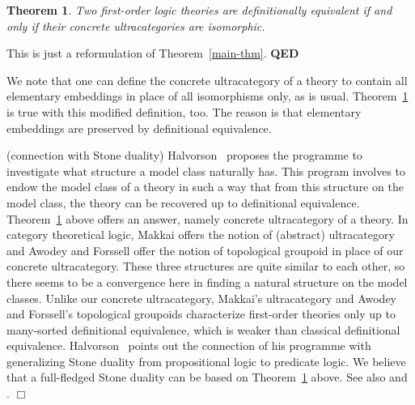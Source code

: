 \documentclass[12pt,leqno]{article}
\newcommand{\comment}[1]{}
\newcommand{\qed}{\hfill\mbox{\bf QED}\bigskip}
\newtheorem{thm}{Theorem}
\begin{document}
\begin{thm}\label{ultracat-thm} Two first-order logic theories are
definitionally equivalent if and only if their concrete
ultracategories are isomorphic.
\end{thm}

This is just a reformulation of
Theorem~\ref{main-thm}. %
\qed\bigskip

We note that one can define the concrete ultracategory of a theory
to contain all elementary embeddings in place of all isomorphisms
only, as is usual.
Theorem~\ref{ultracat-thm} is true with this modified definition,
too. The reason is that elementary embeddings are preserved by
definitional equivalence.
\bigskip

(connection with Stone duality)
Halvorson~\cite[section 7]{Halwhat} proposes the programme to investigate what structure a model class naturally 
has. This program involves to endow the model class of a theory in such a way that from this structure on the model class, the theory can be recovered up to definitional equivalence. Theorem~\ref{ultracat-thm} above offers an answer, namely concrete ultracategory of a theory. In category theoretical logic, Makkai \cite[Theorem 4.1]{Makkai87} offers the notion of (abstract) ultracategory and Awodey and Forssell \cite{Awo} offer the notion of topological groupoid in place of our concrete ultracategory. These three structures are quite similar to each other, so there seems to be a convergence here in finding a natural structure on the model classes. Unlike our concrete ultracategory, Makkai's ultracategory and Awodey and Forssell's topological groupoids characterize first-order theories only up to many-sorted definitional equivalence, which is weaker than classical definitional equivalence. %
Halvorson~\cite{Halwhat} points out the connection of his programme with generalizing Stone duality from propositional logic to predicate logic. We believe that a full-fledged Stone duality can be based on Theorem~\ref{ultracat-thm} above. See also \cite{Makkai85, Makkai87, harnik} and
\cite[p.576]{BH16}.
%
\comment{The above theorem is analogous to Michael Makkai's ultracategory
theorem which is available at present, as far as we know, only in
category theoretical form \cite[Theorem 4.1]{Makkai87}.
Makkai's theorem is about the more general and more refined
definitional equivalence which allows one to define new universes
(and thus automorphism groups are preserved only up to isomorphism),
while Theorem~\ref{ultracat-thm} is about the simpler classical
definability. See \cite{Makkai85, Makkai87, harnik} and
\cite[p.576]{BH16}.} \qquad $\Box$
\bigskip
\end{document}

